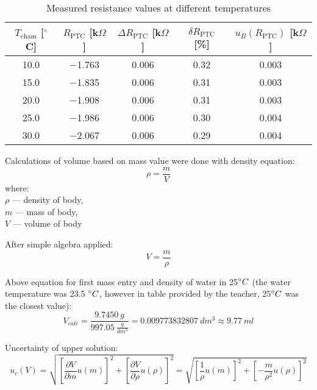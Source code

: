 \documentclass[12pt,a4paper]{article}
\begin{document}
	\begin{table}[H]
		\centering
		\begin{tabular}{|c|c|c|c|c|}
			\hline
			$T_{\text{cham}}$ [$^\circ$C] & $R_{\text{PTC}}$ [k$\Omega$] & $\Delta R_{\text{PTC}}$ [k$\Omega$] & $\delta R_{\text{PTC}}$ [\%] & $u_B (R_{\text{PTC}})$ [k$\Omega$] \\
			\hline \hline
			10.0  & $-$1.763 & 0.006 & 0.32 & 0.003 \\ \hline
			15.0  & $-$1.835 & 0.006 & 0.31 & 0.003 \\ \hline
			20.0  & $-$1.908 & 0.006 & 0.31 & 0.003 \\ \hline
			25.0  & $-$1.986 & 0.006 & 0.30 & 0.004 \\ \hline
			30.0  & $-$2.067 & 0.006 & 0.29 & 0.004 \\
			\hline
		\end{tabular}
		\caption{Measured resistance values at different temperatures}
		\label{tab:someTab}
	\end{table}
	
	Calculations of volume based on mass value were done with density equation:
	\begin{equation}\label{d_eq}
		\rho = \frac{m}{V}
	\end{equation}
	\small
	where: \\
	\indent\indent $\rho$ — density of body,\\
	\indent\indent $m$ — mass of body,\\
	\indent\indent $V$ — volume of body
	\normalsize
	\newline
	
	After simple algebra applied:
	\begin{equation}\label{V_eq}
		V = \frac{m}{\rho}
	\end{equation}
	
	Above equation for first mass entry and density of water in 25$\degree C$ (the water temperature was 23.5 $\degree C$, however in table provided by the teacher, 25$\degree C$ was the closest value):
	\begin{equation}\label{V_eg_eq}
		V_{calc} = \frac{9.7450~g}{997.05~\frac{g}{dm^3}} = 0.009773832807~dm^3 \approx 9.77~ml
	\end{equation}
	
	Uncertainty of upper solution:
	\begin{equation}\label{uc_V_eq}
		u_c(V) = \sqrt{\left[\frac{\partial V}{\partial m} u(m)\right]^2 + \left[\frac{\partial V}{\partial \rho} u(\rho)\right]^2} = \sqrt{\left[\frac{1}{\rho} u(m)\right]^2 + \left[-\frac{m}{\rho^2} u(\rho)\right]^2}
	\end{equation}
	
\end{document}

